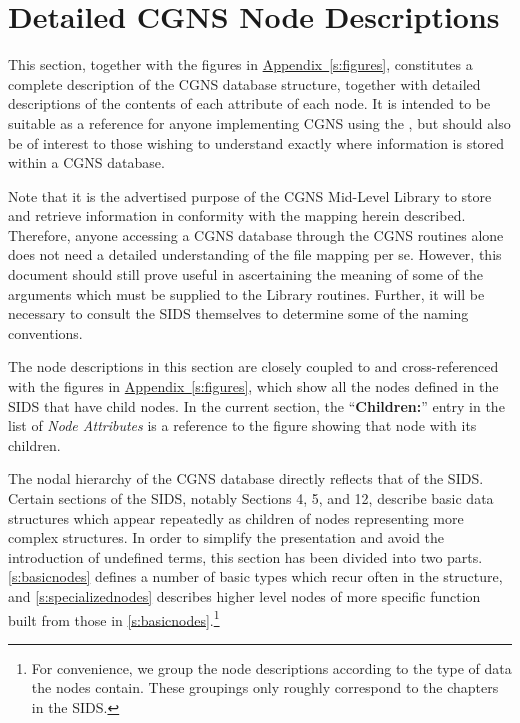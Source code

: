 \section{Detailed CGNS Node Descriptions}
\label{s:nodes}
\thispagestyle{plain}

This section, together with the figures in
\hyperref[s:figures]{Appendix~\ref*{s:figures}}, constitutes a complete
description of the CGNS database structure, together with detailed
descriptions of the contents of each attribute of each node. It is
intended to be suitable as a reference for anyone implementing CGNS
using the \SLL, but should also be of interest to those wishing to
understand exactly where information is stored within a CGNS database.

Note that it is the advertised purpose of the CGNS Mid-Level Library to
store and retrieve information in conformity with the mapping herein
described. Therefore, anyone accessing a CGNS database through the
CGNS routines alone does not need a detailed understanding of the file
mapping per se. However, this document should still prove useful in
ascertaining the meaning of some of the arguments which must be supplied
to the Library routines. Further, it will be necessary to consult the
SIDS themselves to determine some of the naming conventions.

The node descriptions in this section are closely
coupled to and cross-referenced with the figures in
\hyperref[s:figures]{Appendix~\ref*{s:figures}}, which show all the
nodes defined in the SIDS that have child nodes.
In the current section, the ``\textbf{Children:}'' entry in the list of
\textit{Node Attributes} is a reference to the figure showing that node
with its children.

The nodal hierarchy of the CGNS database directly reflects that of the
SIDS. Certain sections of the SIDS, notably Sections 4, 5, and 12,
describe basic data structures which appear repeatedly as children
of nodes representing more complex structures. In order to simplify
the presentation and avoid the introduction of undefined terms, this
section has been divided into two parts. \autoref{s:basicnodes}
defines a number of basic types which recur often in the structure,
and \autoref{s:specializednodes} describes higher level nodes of more
specific function built from those in \autoref{s:basicnodes}.\footnote{For
convenience, we group the node descriptions according to the type of
data the nodes contain. These groupings only roughly correspond to the
chapters in the SIDS.}

